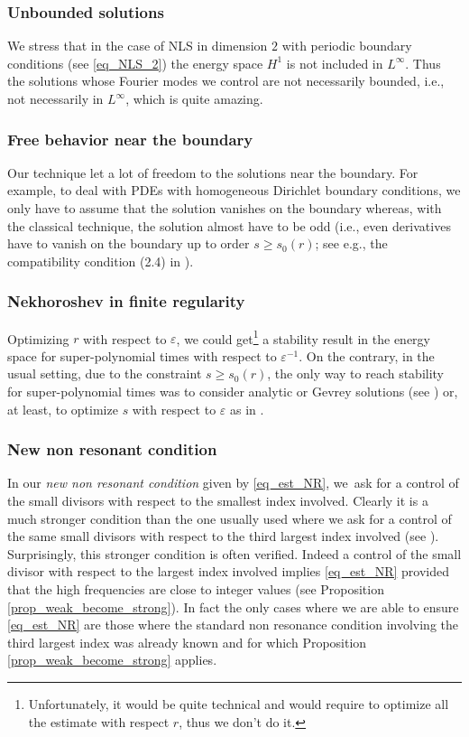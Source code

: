 \documentclass[11pt]{article}
\newcommand{\ie}{i.e.,\xspace}
\newcommand{\eg}{e.g.,\xspace}
\theoremstyle{definition}
\begin{document}
\subsubsection*{Unbounded solutions}
We stress that in the case of NLS in dimension $2$ with periodic boundary conditions (see \eqref{eq_NLS_2}) the energy space $H^1$ is not included in $L^\infty$. Thus the solutions whose Fourier modes we control are not necessarily bounded, \ie not necessarily in $L^\infty$, which is quite amazing.

\subsubsection*{Free behavior near the boundary}
Our technique let a lot of freedom to the solutions near the boundary. For example, to deal with PDEs with homogeneous Dirichlet boundary conditions, we only have to assume that the solution vanishes on the boundary whereas, with the classical technique, the solution almost have to be odd (\ie even derivatives have to vanish on the boundary up to order $s\geq s_0(r)$; see \eg the compatibility condition (2.4) in \cite{Bam03}).

\subsubsection*{Nekhoroshev in finite regularity}
Optimizing $r$ with respect to $\varepsilon$, we could get\footnote{Unfortunately, it would be quite technical and would require to optimize all the estimate with respect $r$, thus we don't do it.} a stability result in the energy space for super-polynomial times with respect to $\varepsilon^{-1}$. On the contrary, in the usual setting, due to the constraint $s\geq s_0(r)$, the only way to reach stability for super-polynomial times was to consider analytic or Gevrey solutions (see \cite{FG13,BMP20}) or, at least, to optimize $s$ with respect to $\varepsilon$ as in \cite{BMP20}.

\subsubsection*{New non resonant condition}
In our {\it new non resonant condition} given by \eqref{eq_est_NR}, we~ask for a control of the small divisors with respect to the smallest index involved. Clearly it is a much stronger condition than the one usually used where we ask for a control of the same small divisors with respect to the third largest index involved (see \cite{BG06}). Surprisingly, this stronger condition is often verified. Indeed a control of the small divisor with respect to the largest index involved implies \eqref{eq_est_NR} provided that the high frequencies are close to integer values (see Proposition \ref{prop_weak_become_strong}). In fact the only cases where we are able to ensure \eqref{eq_est_NR} are those where the standard non resonance condition involving the third largest index was already known and for which Proposition \ref{prop_weak_become_strong} applies.
\end{document}

